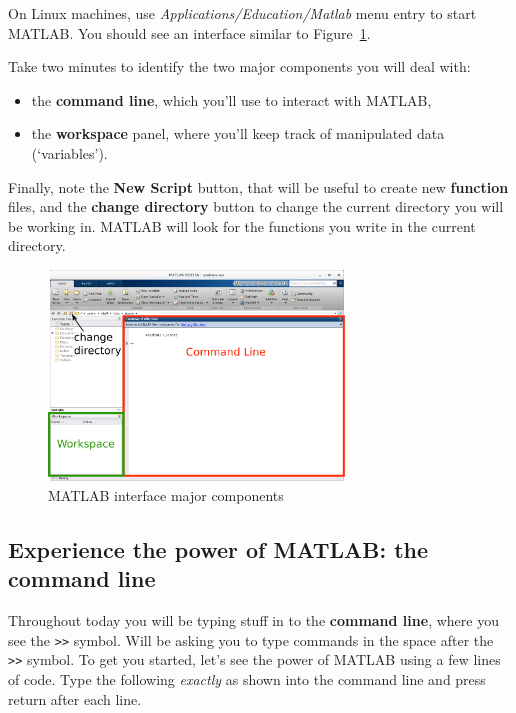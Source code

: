 \documentclass{article}
\begin{document}
On Linux machines, use \emph{Applications/Education/Matlab} menu entry to start MATLAB.
You should see an interface similar to Figure~\ref{fig:interface}.

Take two minutes to identify the two major components you will deal with:
\begin{itemize}
\item the \textbf{command line}, which you'll use to interact with MATLAB,
\item the \textbf{workspace} panel, where you'll keep track of manipulated data (`variables').
\end{itemize}

Finally, note the \textbf{New Script} button, that will be useful to create new \textbf{function} files,
and the \textbf{change directory} button to change the current directory you will be working in. MATLAB will 
look for the functions you write in the current directory.

\begin{figure}[h]
  \centering
  \includegraphics[width=0.7\textwidth]{interface.pdf}
  \caption{MATLAB interface major components}\label{fig:interface}
\end{figure}

\subsection*{Experience the power of MATLAB: the command line}
Throughout today you will be typing stuff in to the \textbf{command line}, where you see the \verb|>>| symbol.
Will be asking you to type commands in the space after the \verb|>>| symbol. 
To get you started, let's see the power of MATLAB using a few lines of code. 
Type the following \textit{exactly} as shown into the command line and press return after each line.\\
\end{document}
